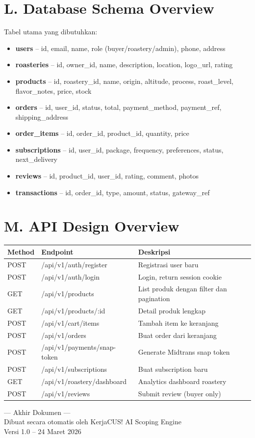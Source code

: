 \documentclass[11pt,a4paper]{article}
\begin{document}
\section{L. Database Schema Overview}
Tabel utama yang dibutuhkan:
\begin{itemize}[noitemsep,leftmargin=1.5cm]
\item \textbf{users} -- id, email, name, role (buyer/roastery/admin), phone, address
\item \textbf{roasteries} -- id, owner\_id, name, description, location, logo\_url, rating
\item \textbf{products} -- id, roastery\_id, name, origin, altitude, process, roast\_level, flavor\_notes, price, stock
\item \textbf{orders} -- id, user\_id, status, total, payment\_method, payment\_ref, shipping\_address
\item \textbf{order\_items} -- id, order\_id, product\_id, quantity, price
\item \textbf{subscriptions} -- id, user\_id, package, frequency, preferences, status, next\_delivery
\item \textbf{reviews} -- id, product\_id, user\_id, rating, comment, photos
\item \textbf{transactions} -- id, order\_id, type, amount, status, gateway\_ref
\end{itemize}

\section{M. API Design Overview}
\noindent\small
\begin{tabularx}{\textwidth}{|X|X|X|}
\hline
\centering\textbf{Method}\arraybackslash & \centering\textbf{Endpoint}\arraybackslash & \centering\textbf{Deskripsi}\arraybackslash \\\hline
POST & /api/v1/auth/register & Registrasi user baru \\\hline
POST & /api/v1/auth/login & Login, return session cookie \\\hline
GET & /api/v1/products & List produk dengan filter dan pagination \\\hline
GET & /api/v1/products/:id & Detail produk lengkap \\\hline
POST & /api/v1/cart/items & Tambah item ke keranjang \\\hline
POST & /api/v1/orders & Buat order dari keranjang \\\hline
POST & /api/v1/payments/snap-token & Generate Midtrans snap token \\\hline
POST & /api/v1/subscriptions & Buat subscription baru \\\hline
GET & /api/v1/roastery/dashboard & Analytics dashboard roastery \\\hline
POST & /api/v1/reviews & Submit review (buyer only) \\\hline
\end{tabularx}\normalsize

\vspace{1.5cm}
\begin{center}\small
--- Akhir Dokumen ---\\
Dibuat secara otomatis oleh KerjaCUS! AI Scoping Engine\\
Versi 1.0 -- 24 Maret 2026
\end{center}
\end{document}
